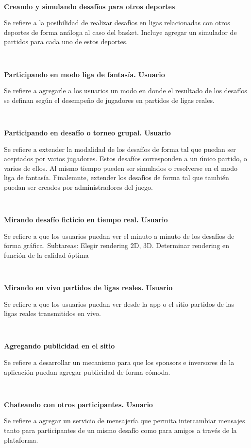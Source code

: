 ~

\textbf{Creando y simulando desafíos para otros deportes}

Se refiere a la posibilidad de realizar desafíos en ligas relacionadas con otros deportes de forma análoga al caso del basket. 
Incluye agregar un simulador de partidos para cada uno de estos deportes.

~

\textbf{Participando en modo liga de fantasía. Usuario}

Se refiere a agregarle a los usuarios un modo en donde el resultado de los desafíos se definan según el desempeño de jugadores en partidos 
de ligas reales.

~

\textbf{Participando en desafío o torneo grupal. Usuario}

Se refiere a extender la modalidad de los desafíos de forma tal que puedan ser aceptados por varios jugadores. Estos desafíos corresponden a
un único partido, o varios de ellos. Al mismo tiempo pueden ser simulados o resolverse en el modo liga de fantasía.
Finalemnte, extender los desafíos de forma tal que también puedan ser creados por administradores del juego. 

~

\textbf{Mirando desafío ficticio en tiempo real. Usuario}

Se refiere a que los usuarios puedan ver el minuto a minuto de los desafíos de forma gráfica. 
Subtareas: Elegir rendering 2D, 3D. Determinar rendering en función de la calidad óptima

~

\textbf{Mirando en vivo partidos de ligas reales. Usuario}

Se refiere a que los usuarios puedan ver desde la app o el sitio partidos de las ligas reales transmitidos en vivo.

~

\textbf{Agregando publicidad en el sitio}

Se refiere a desarrollar un mecanismo para que los sponsors e inversores de la aplicación puedan agregar publicidad de forma cómoda.

~

\textbf{Chateando con otros participantes. Usuario}

Se refiere a agregar un servicio de mensajería que permita intercambiar mensajes tanto para participantes de un mismo desafío como para
amigos a través de la plataforma.

~

